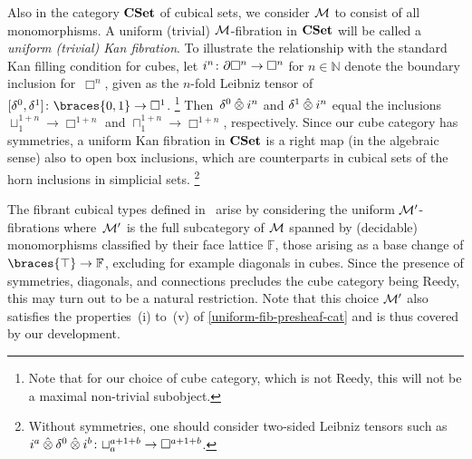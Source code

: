 \documentclass[reqno,10pt,a4paper,oneside,draft]{amsart}
\begin{document}
\begin{example} Also in the category $\CSet$ of cubical sets, we consider $\cal{M}$ to consist of all monomorphisms.
A uniform (trivial) $\cal{M}$-fibration in $\CSet$ will be called a \emph{uniform (trivial) Kan fibration}.
To illustrate the relationship with the standard Kan filling condition for cubes, let $i^n \co \partial \Box^n \to \Box^n$ for $n \in \mathbb{N}$ denote the boundary inclusion for~$\Box^n$, given as the $n$-fold Leibniz tensor of $[\lcyl, \rcyl] \co \braces{0, 1} \to \Box^1$.%
\footnote{Note that for our choice of cube category, which is not Reedy, this will not be a maximal non-trivial subobject.}
Then~$\lcyl \hatotimes i^n$ and $\rcyl \hatotimes i^n$ equal the inclusions $\sqcup_1^{1+n} \to \Box^{1+n}$ and $\sqcap_1^{1+n} \to \Box^{1+n}$, respectively.
Since our cube category has symmetries, a uniform Kan fibration in $\CSet$ is a right map (in the algebraic sense) also to open box inclusions, which are counterparts in cubical sets of the horn inclusions in simplicial sets.%
\footnote{Without symmetries, one should consider two-sided Leibniz tensors such as $i^a \hatotimes \lcyl \hatotimes i^b \co \sqcup_a^{a+1+b} \to \Box^{a+1+b}$.}

The fibrant cubical types defined in~\cite{cohen-et-al:cubicaltt} arise by considering the uniform $\cal{M}'$-fibrations where~$\cal{M}'$ is the full subcategory of $\cal{M}$ spanned by (decidable) monomorphisms classified by their face lattice $\mathbb{F}$, \ie those arising as a base change of $\braces{\top} \to \mathbb{F}$, excluding for example diagonals in cubes.
Since the presence of symmetries, diagonals, and connections precludes the cube category being Reedy, this may turn out to be a natural restriction.
Note that this choice $\cal{M}'$ also satisfies the properties~(i) to~(v) of \cref{uniform-fib-presheaf-cat} and is thus covered by our development.
\end{example}
\end{document}
